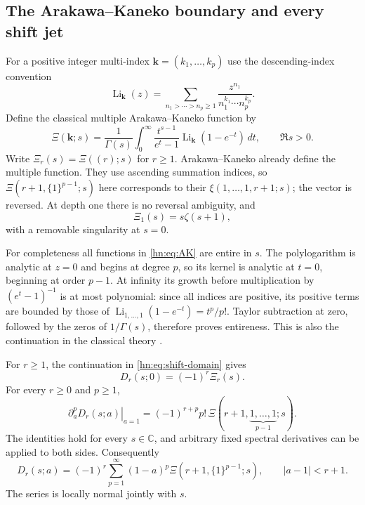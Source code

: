 \subsection{The Arakawa--Kaneko boundary and every shift jet}

For a positive integer multi-index
$\boldsymbol{k}=(k_1,\ldots,k_p)$ use the descending-index convention
\[
 \operatorname{Li}_{\boldsymbol{k}}(z)
 =\sum_{n_1>\cdots>n_p\ge1}
       \frac{z^{n_1}}{n_1^{k_1}\cdots n_p^{k_p}}.
\]
Define the classical multiple Arakawa--Kaneko function by
\begin{equation}\label{hn:eq:AK}
 \Xi(\boldsymbol{k};s)=\frac1{\Gamma(s)}\int_0^\infty
       \frac{t^{s-1}}{e^t-1}
              \operatorname{Li}_{\boldsymbol{k}}(1-e^{-t})\,dt,
 \qquad \Re s>0.
\end{equation}
Write $\Xi_r(s)=\Xi((r);s)$ for $r\ge1$.
Arakawa--Kaneko \cite{AK1999} already define the multiple function.
They use ascending summation indices, so
$\Xi(r+1,\{1\}^{p-1};s)$ here corresponds to their
$\xi(1,\ldots,1,r+1;s)$; the vector is reversed.
At depth one there is no reversal ambiguity, and
\[
                         \Xi_1(s)=s\zeta(s+1),
\]
with a removable singularity at $s=0$.

For completeness all functions in \eqref{hn:eq:AK} are entire in $s$.
The polylogarithm is analytic at $z=0$ and begins at degree $p$,
so its kernel is analytic at $t=0$, beginning at order $p-1$.
At infinity its growth before multiplication by $(e^t-1)^{-1}$
is at most polynomial: since all indices are positive, its
positive terms are bounded by those of
$\operatorname{Li}_{1,\ldots,1}(1-e^{-t})=t^p/p!$.
Taylor subtraction at zero, followed by the zeros of $1/\Gamma(s)$,
therefore proves entireness. This is also the continuation in
the classical theory \cite{AK1999,KT2018}.

\begin{theorem}\label{hn:thm:AKbridge}
For $r\ge1$, the continuation in \eqref{hn:eq:shift-domain} gives
\begin{equation}\label{hn:eq:a0}
                      D_r(s;0)=(-1)^r\Xi_r(s).
\end{equation}
For every $r\ge0$ and $p\ge1$,
\begin{equation}\label{hn:eq:a1-jets}
 \boxed{\displaystyle
 \left.\partial_a^pD_r(s;a)\right|_{a=1}
  =(-1)^{r+p}p!\,
          \Xi(r+1,\underbrace{1,\ldots,1}_{p-1};s).}
\end{equation}
The identities hold for every $s\in\mathbb C$, and arbitrary
fixed spectral derivatives can be applied to both sides.
Consequently
\begin{equation}\label{hn:eq:AK-Taylor}
 D_r(s;a)=(-1)^r\sum_{p=1}^\infty
       (1-a)^p\Xi(r+1,\{1\}^{p-1};s),
 \qquad |a-1|<r+1.
\end{equation}
The series is locally normal jointly with $s$.
\end{theorem}

